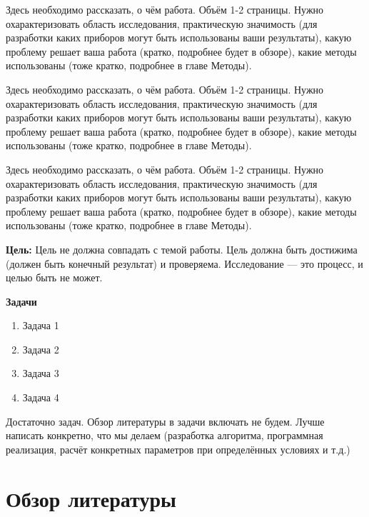 \documentclass[a4paper,14pt]{extarticle}
\begin{document}


\tableofcontents
\pagebreak


Здесь необходимо рассказать, о чём работа. Объём 1-2 страницы. Нужно охарактеризовать область исследования, практическую значимость (для разработки каких приборов могут быть использованы ваши результаты), какую проблему решает ваша работа (кратко, подробнее будет в обзоре), какие методы использованы (тоже кратко, подробнее в главе Методы).

Здесь необходимо рассказать, о чём работа. Объём 1-2 страницы. Нужно охарактеризовать область исследования, практическую значимость (для разработки каких приборов могут быть использованы ваши результаты), какую проблему решает ваша работа (кратко, подробнее будет в обзоре), какие методы использованы (тоже кратко, подробнее в главе Методы).

Здесь необходимо рассказать, о чём работа. Объём 1-2 страницы. Нужно охарактеризовать область исследования, практическую значимость (для разработки каких приборов могут быть использованы ваши результаты), какую проблему решает ваша работа (кратко, подробнее будет в обзоре), какие методы использованы (тоже кратко, подробнее в главе Методы).

\label{Tasks}

\textbf{Цель:} Цель не должна совпадать с темой работы. Цель должна быть достижима (должен быть конечный результат) и проверяема. Исследование --- это процесс, и целью быть не может.

\textbf{Задачи}
\begin{enumerate}
    \item Задача 1
    \item Задача 2
    \item Задача 3
    \item Задача 4
\end{enumerate}

Достаточно задач. Обзор литературы в задачи включать не будем. Лучше написать конкретно, что мы делаем (разработка алгоритма, программная реализация, расчёт конкретных параметров при определённых условиях и т.д.)

\pagebreak
\section{Обзор литературы}
\end{document}
